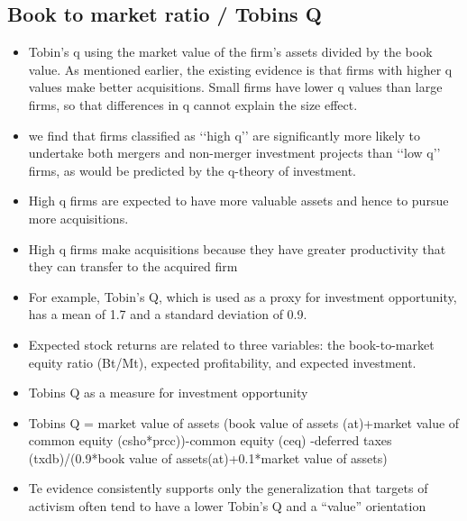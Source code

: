 \documentclass[12pt]{article}
\begin{document}
\subsection{Book to market ratio / Tobins Q}

    \begin{itemize}
        \item Tobin’s q using the market value of the firm’s assets divided by the book value. As mentioned earlier, the existing evidence is that firms with higher q values make better acquisitions. Small firms have lower q values than large firms, so that differences in q cannot explain the size effect. \citep{Moeller2004}

        \item we find that firms classified as ‘‘high q’’ are significantly more likely to undertake both mergers and non-merger investment projects than ‘‘low q’’ firms, as would be predicted by the q-theory of investment. 

        \item High q firms are expected to have more valuable assets and hence to pursue more acquisitions. \citep{Arikan2016}

        \item High q firms make acquisitions because they have greater productivity that they can transfer to the acquired firm \citep{Arikan2016}

        \item For example, Tobin’s Q, which is used as a proxy for investment opportunity, has a mean of 1.7 and a standard deviation of 0.9.\citep{DUCHIN2010}

        \item Expected stock returns are related to three variables: the book-to-market equity ratio (Bt/Mt), expected profitability, and expected investment.\citep{Fama2006}

        \item Tobins Q as a measure for investment opportunity \citep{DUCHIN2010}

        \item Tobins Q = market value of assets (book value of assets (at)+market value of common equity (csho*prcc))-common equity (ceq) -deferred taxes (txdb)/(0.9*book value of assets(at)+0.1*market value of assets) \citep{DUCHIN2010}

        \item Te evidence consistently supports only the generalization that targets of activism often tend to have a lower Tobin’s Q and a “value” orientation \citep{CoffeeJr.2014}


\end{itemize}
\end{document}
